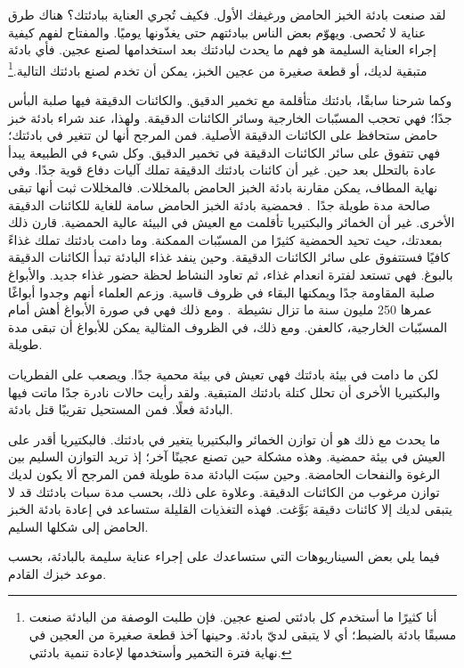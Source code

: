 لقد صنعت بادئة الخبز الحامض ورغيفك الأول. فكيف تُجري العناية ببادئتك؟ هناك طرق عناية لا تُحصى. ويهوّم بعض الناس ببادئتهم حتى يغذّونها يوميًا. والمفتاح لفهم كيفية إجراء العناية السليمة هو فهم ما يحدث لبادئتك بعد استخدامها لصنع عجين. فأي بادئة متبقية لديك، أو قطعة صغيرة من عجين الخبز، يمكن أن تخدم لصنع بادئتك التالية.\footnote{أنا كثيرًا ما أستخدم كل بادئتي لصنع عجين. فإن طلبت الوصفة  من البادئة صنعت مسبقًا  بادئة بالضبط؛ أي لا يتبقى لديّ بادئة. وحينها آخذ قطعة صغيرة من العجين في نهاية فترة التخمير وأستخدمها لإعادة تنمية بادئتي.}

وكما شرحنا سابقًا، بادئتك متأقلمة مع تخمير الدقيق. والكائنات الدقيقة فيها صلبة البأس جدًا؛ فهي تحجب المسبّبات الخارجية وسائر الكائنات الدقيقة. ولهذا، عند شراء بادئة خبز حامض ستحافظ على الكائنات الدقيقة الأصلية. فمن المرجح أنها لن تتغير في بادئتك؛ فهي تتفوق على سائر الكائنات الدقيقة في تخمير الدقيق. وكل شيء في الطبيعة يبدأ عادة بالتحلل بعد حين. غير أن كائنات بادئتك الدقيقة تملك آليات دفاع قوية جدًا. وفي نهاية المطاف، يمكن مقارنة بادئة الخبز الحامض بالمخللات. فالمخللات ثبت أنها تبقى صالحة مدة طويلة جدًا~\cite{pickled+foods+expiration}. فحمضية بادئة الخبز الحامض سامة للغاية للكائنات الدقيقة الأخرى. غير أن الخمائر والبكتيريا تأقلمت مع العيش في البيئة عالية الحمضية. قارن ذلك بمعدتك، حيث تحيد الحمضية كثيرًا من المسبّبات الممكنة. وما دامت بادئتك تملك غذاءً كافيًا فستتفوق على سائر الكائنات الدقيقة. وحين ينفد غذاء البادئة تبدأ الكائنات الدقيقة بالبوغ. فهي تستعد لفترة انعدام غذاء، ثم تعاود النشاط لحظة حضور غذاء جديد. والأبواغ صلبة المقاومة جدًا ويمكنها البقاء في ظروف قاسية. وزعم العلماء أنهم وجدوا أبواغًا عمرها 250 مليون سنة ما تزال نشيطة~\cite{old+spores}. ومع ذلك فهي في صورة الأبواغ أهش أمام المسبّبات الخارجية، كالعفن. ومع ذلك، في الظروف المثالية يمكن للأبواغ أن تبقى مدة طويلة.

لكن ما دامت في بيئة بادئتك فهي تعيش في بيئة محمية جدًا. ويصعب على الفطريات والبكتيريا الأخرى أن تحلل كتلة بادئتك المتبقية. ولقد رأيت حالات نادرة جدًا ماتت فيها البادئة فعلًا. فمن المستحيل تقريبًا قتل بادئة.

ما يحدث مع ذلك هو أن توازن الخمائر والبكتيريا يتغير في بادئتك. فالبكتيريا أقدر على العيش في بيئة حمضية. وهذه مشكلة حين تصنع عجينًا آخر؛ إذ تريد التوازن السليم بين الرغوة والنفحات الحامضة. وحين سبَت البادئة مدة طويلة فمن المرجح ألا يكون لديك توازن مرغوب من الكائنات الدقيقة. وعلاوة على ذلك، بحسب مدة سبات بادئتك قد لا يتبقى لديك إلا كائنات دقيقة بَوَّغت. فهذه التغذيات القليلة ستساعد في إعادة بادئة الخبز الحامض إلى شكلها السليم.

فيما يلي بعض السيناريوهات التي ستساعدك على إجراء عناية سليمة بالبادئة، بحسب موعد خبزك القادم.

